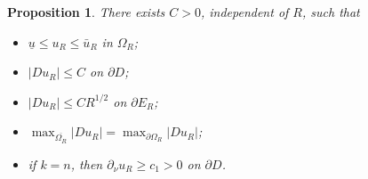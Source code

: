 \documentclass[reqno,a4paper]{amsart}
\numberwithin{equation}{section}
\newtheorem{proposition}{Proposition}[section]
\begin{document}
	\begin{proposition}
		There exists $C > 0$, independent of $R$, such that
		\begin{itemize}
			\item[(i)] $\underline{u} \le u_R \le \bar{u}_R$ in $\Omega_R$;
			\item[(ii)] $|Du_R| \le C$ on $\partial D$;
			\item[(iii)] $|Du_R| \le C R^{1/2}$ on $\partial E_R$;
			\item[(iv)] $\displaystyle \max_{\overline{\Omega_R}} |Du_R| = \max_{\partial \Omega_R} |Du_R|$;
			\item[(v)] if $k=n$, then $\partial_\nu u_R \ge c_1 > 0$ on $\partial D$.
		\end{itemize}
	\end{proposition}
	
\end{document}
